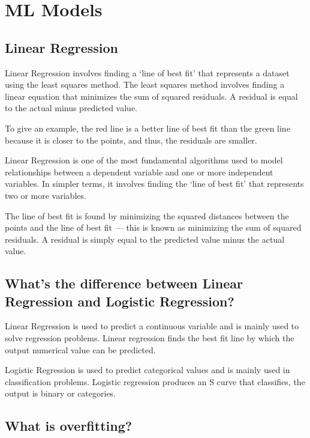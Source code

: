 \documentclass[
]{book}
\begin{document}
\hypertarget{intro}{%
\chapter{ML Models}\label{intro}}

\hypertarget{linear-regression-1}{%
\section{Linear Regression}\label{linear-regression-1}}

Linear Regression involves finding a `line of best fit' that represents a dataset using the least squares method. The least squares method involves finding a linear equation that minimizes the sum of squared residuals. A residual is equal to the actual minus predicted value.

To give an example, the red line is a better line of best fit than the green line because it is closer to the points, and thus, the residuals are smaller.

Linear Regression is one of the most fundamental algorithms used to model relationships between a dependent variable and one or more independent variables. In simpler terms, it involves finding the `line of best fit' that represents two or more variables.

The line of best fit is found by minimizing the squared distances between the points and the line of best fit --- this is known as minimizing the sum of squared residuals. A residual is simply equal to the predicted value minus the actual value.

\hypertarget{whats-the-difference-between-linear-regression-and-logistic-regression}{%
\section{What's the difference between Linear Regression and Logistic Regression?}\label{whats-the-difference-between-linear-regression-and-logistic-regression}}

Linear Regression is used to predict a continuous variable and is mainly used to solve regression problems. Linear regression finds the best fit line by which the output numerical value can be predicted.

Logistic Regression is used to predict categorical values and is mainly used in classification problems. Logistic regression produces an S curve that classifies, the output is binary or categories.

\hypertarget{what-is-overfitting}{%
\section{What is overfitting?}\label{what-is-overfitting}}
\end{document}

